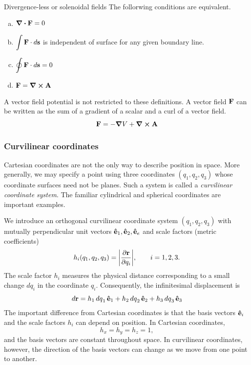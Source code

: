 			\begin{theorem}{Divergence-less or solenoidal fields}
				The follorwing conditions are equivalent.
				\begin{enumerate}[(a)]
					\item $\div \vb{F} = 0$ 
					\item $\displaystyle\int \vb{F}\cdot \dd{\vb s}$ is independent of surface for any given boundary line.
					\item $\displaystyle\oint \vb{F} \cdot \dd{\vb s} = 0$ 
					\item $\vb{F} = \curl \vb{A}$
				\end{enumerate}
			\end{theorem}
			\vspace{2em}
			\begin{remark}
				A vector field potential is not restricted to these definitions.
				A vector field $\vb{F}$ can be written as the sum of a gradient of a scalar and 
				a curl of a vector field.
				\begin{equation}
					\vb F = -\grad V + \curl \vb{A}
				\end{equation}
			\end{remark}

	\subsubsection{Curvilinear coordinates}

		Cartesian coordinates are not the only way to describe position in space. More generally, we may specify a point using three coordinates $(q_1,q_2,q_3)$ whose coordinate surfaces need not be planes. Such a system is called a \textit{curvilinear coordinate system}. The familiar cylindrical and spherical coordinates are important examples.

		We introduce an orthogonal curvilinear coordinate system $(q_1,q_2,q_3)$ with mutually perpendicular unit vectors
		$\vu{e}_1,\vu{e}_2,\vu{e}_e$
		and scale factors (metric coefficients)
		\[
			h_i(q_1,q_2,q_3) =
			\abs{\pdv{\vb{r}}{q_i}},
			\qquad i=1,2,3.
		\]
		The scale factor $h_i$ measures the physical distance corresponding to a small change $dq_i$ in the coordinate $q_i$. Consequently, the infinitesimal displacement is
		\[
			\dd{\vb{r}} =
			h_1\dd{q}_1\vu{e}_1
			+
			h_2\dd{q}_2\vu{e}_2
			+
			h_3\dd{q}_3\vu{e}_3
		\]
		The important difference from Cartesian coordinates is that the basis vectors
		$\vu{e}_i$ and the scale factors $h_i$ can depend on position. In Cartesian coordinates,
		\[
			h_x=h_y=h_z=1,
		\]
		and the basis vectors are constant throughout space. In curvilinear coordinates, however, the direction of the basis vectors can change as we move from one point to another.

